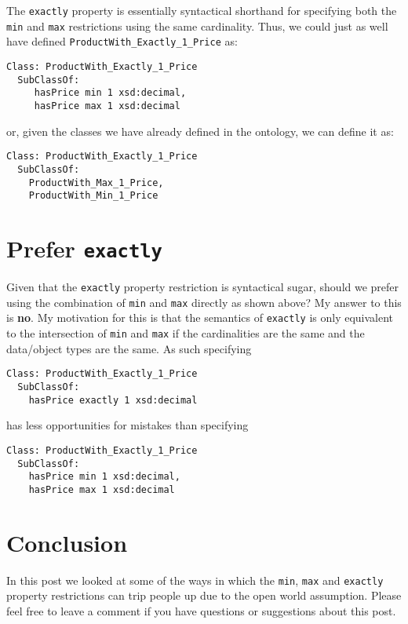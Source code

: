 \documentclass{amsart}
\begin{document}
The \texttt{exactly} property is essentially syntactical shorthand for specifying both the \texttt{min} and \texttt{max} restrictions using the same cardinality. Thus, we could just as well have defined \texttt{ProductWith\_Exactly\_1\_Price} as:

\begin{small}
	\begin{verbatim} 
Class: ProductWith_Exactly_1_Price
  SubClassOf: 
     hasPrice min 1 xsd:decimal,
     hasPrice max 1 xsd:decimal
	\end{verbatim}
\end{small}

or, given the classes we have already defined in the ontology, we can define it as:

\begin{small}
	\begin{verbatim} 
Class: ProductWith_Exactly_1_Price
  SubClassOf: 
    ProductWith_Max_1_Price,
    ProductWith_Min_1_Price   
	\end{verbatim}
\end{small}

\section{Prefer \texttt{exactly}}
Given that the \texttt{exactly} property restriction is syntactical sugar, should we prefer using the combination of \texttt{min} and \texttt{max} directly as shown above? My answer to this is \textbf{no}. My motivation for this is that the semantics of \texttt{exactly} is only equivalent to the intersection of \texttt{min} and \texttt{max} if the cardinalities are the same and the data/object types are the same. As such specifying  
\begin{small}
	\begin{verbatim} 
Class: ProductWith_Exactly_1_Price
  SubClassOf: 
    hasPrice exactly 1 xsd:decimal    
	\end{verbatim}
\end{small}
has less opportunities for mistakes than specifying 
\begin{small}
	\begin{verbatim} 
Class: ProductWith_Exactly_1_Price
  SubClassOf: 
    hasPrice min 1 xsd:decimal,
    hasPrice max 1 xsd:decimal
	\end{verbatim}
\end{small}

\section{Conclusion}
In this post we looked at some of the ways in which the \texttt{min}, \texttt{max} and \texttt{exactly} property restrictions can trip people up due to the open world assumption. Please feel free to leave a comment if you have questions or suggestions about this post.

  
  
  
 
\end{document}
